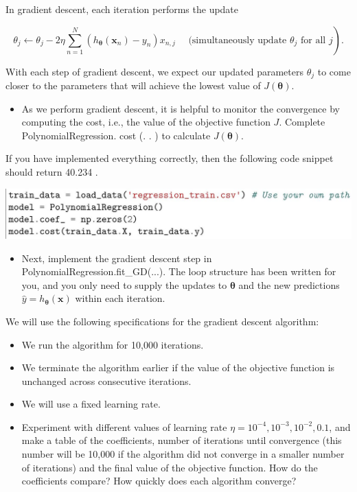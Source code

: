 \documentclass[10pt]{article}
\begin{document}
In gradient descent, each iteration performs the update

$$
\left.\theta_{j} \leftarrow \theta_{j}-2 \eta \sum_{n=1}^{N}\left(h_{\boldsymbol{\theta}}\left(\boldsymbol{x}_{n}\right)-y_{n}\right) x_{n, j} \quad \text { (simultaneously update } \theta_{j} \text { for all } j\right) .
$$

With each step of gradient descent, we expect our updated parameters $\theta_{j}$ to come closer to the parameters that will achieve the lowest value of $J(\boldsymbol{\theta})$.

\begin{itemize}
  \item As we perform gradient descent, it is helpful to monitor the convergence by computing the cost, i.e., the value of the objective function $J$. Complete PolynomialRegression. cost (. . ) to calculate $J(\boldsymbol{\theta})$.
\end{itemize}

If you have implemented everything correctly, then the following code snippet should return 40.234 .

\begin{center}
\includegraphics[max width=\textwidth]{2024_02_15_81352c3b436fa7594d79g-6}
\end{center}

\begin{itemize}
  \item Next, implement the gradient descent step in PolynomialRegression.fit\_GD(...). The loop structure has been written for you, and you only need to supply the updates to $\boldsymbol{\theta}$ and the new predictions $\hat{y}=h_{\boldsymbol{\theta}}(\boldsymbol{x})$ within each iteration.
\end{itemize}

We will use the following specifications for the gradient descent algorithm:

\begin{itemize}
  \item We run the algorithm for 10,000 iterations.
  \item We terminate the algorithm earlier if the value of the objective function is unchanged across consecutive iterations.
  \item We will use a fixed learning rate.
  \item Experiment with different values of learning rate $\eta=10^{-4}, 10^{-3}, 10^{-2}, 0.1$, and make a table of the coefficients, number of iterations until convergence (this number will be 10,000 if the algorithm did not converge in a smaller number of iterations) and the final value of the objective function. How do the coefficients compare? How quickly does each algorithm converge?
\end{itemize}\\
\end{document}
